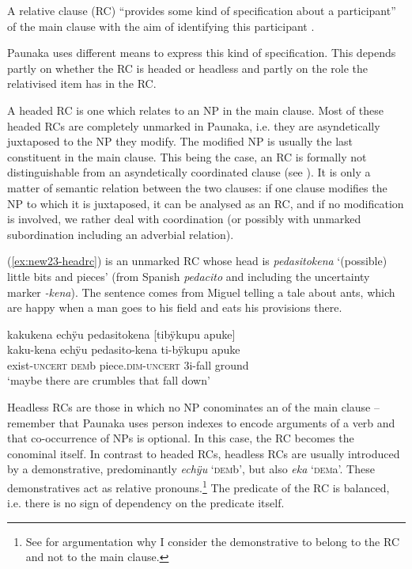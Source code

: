 A relative clause (RC) “provides some kind of specification about a participant” of the main clause with the aim of identifying this participant \citep[195]{Cristofaro2003}. 

Paunaka uses different means to express this kind of specification. This depends partly on whether the RC is headed or headless and partly on the role the relativised item has in the RC. 


A headed RC is one which relates to an NP in the main clause. Most of these headed RCs are completely unmarked in Paunaka, i.e. they are asyndetically juxtaposed to the NP they modify. The modified NP is usually the last constituent in the main clause. This being the case, an RC is formally not distinguishable from an asyndetically coordinated clause (see ). It is only a matter of semantic relation between the two clauses: if one clause modifies the NP to which it is juxtaposed, it can be analysed as an RC, and if no modification is involved, we rather deal with coordination (or possibly with unmarked subordination including an adverbial relation). %

(\ref{ex:new23-headrc}) is an unmarked RC whose head is \textit{pedasitokena} ‘(possible) little bits and pieces’ (from Spanish \textit{pedacito} and including the uncertainty marker \textit{-kena}). The sentence comes from Miguel telling a tale about ants, which are happy when a man goes to his field and eats his provisions there.

\ea\label{ex:new23-headrc}
\begingl
\glpreamble kakukena echÿu pedasitokena \textup{[}tibÿkupu apuke\textup{]}\\
\gla kaku-kena echÿu pedasito-kena ti-bÿkupu apuke\\
\glb exist-\textsc{uncert} \textsc{dem}b piece.\textsc{dim}-\textsc{uncert} 3i-fall ground\\
\glft ‘maybe there are crumbles that fall down’
\endgl
{}
\xe
{}

Headless RCs are those in which no NP conominates an  of the main clause – remember that Paunaka uses person indexes to encode arguments of a verb and that co-occurrence of NPs is optional. In this case, the RC becomes the conominal itself. In contrast to headed RCs, headless RCs are usually introduced by a demonstrative, predominantly \textit{echÿu} ‘\textsc{dem}b’, but also \textit{eka} ‘\textsc{dem}a’. These demonstratives act as relative pronouns.\footnote{See  for argumentation why I consider the demonstrative to belong to the RC and not to the main clause.} The predicate of the RC is balanced, i.e. there is no sign of dependency on the predicate itself.

